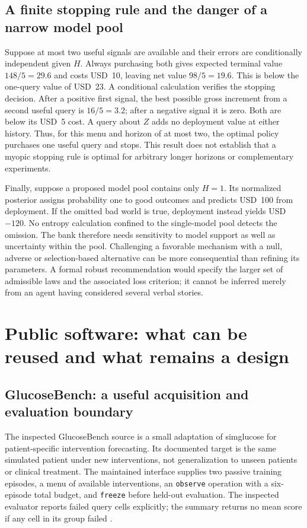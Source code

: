 \subsection{A finite stopping rule and the danger of a narrow model pool}

Suppose at most two useful signals are available and their errors are
conditionally independent given $H$. Always purchasing both gives expected
terminal value $148/5=29.6$ and costs USD~10, leaving net value $98/5=19.6$.
This is below the one-query value of USD~23. A conditional calculation verifies
the stopping decision. After a positive first signal, the best possible gross
increment from a second useful query is $16/5=3.2$; after a negative signal
it is zero. Both are below its USD~5 cost. A query about $Z$ adds no deployment
value at either history. Thus, for this menu and horizon of at most two,
the optimal policy purchases one useful query and stops. This result does
not establish that a myopic stopping rule is optimal for arbitrary longer
horizons or complementary experiments.

Finally, suppose a proposed model pool contains only $H=1$. Its normalized
posterior assigns probability one to good outcomes and predicts USD~100 from
deployment. If the omitted bad world is true, deployment instead yields
USD~$-120$. No entropy calculation confined to the single-model pool detects
the omission. The bank therefore needs sensitivity to model support as well
as uncertainty within the pool. Challenging a favorable mechanism with a
null, adverse or selection-based alternative can be more consequential than
refining its parameters. A formal robust recommendation would specify the
larger set of admissible laws and the associated loss criterion; it cannot
be inferred merely from an agent having considered several verbal stories.

\section{Public software: what can be reused and what remains a design}

\subsection{GlucoseBench: a useful acquisition and evaluation boundary}

The inspected GlucoseBench source is a small adaptation of simglucose for
patient-specific intervention forecasting. Its documented target is the same
simulated patient under new interventions, not generalization to unseen
patients or clinical treatment. The maintained interface supplies two passive
training episodes, a menu of available interventions, an \texttt{observe}
operation with a six-episode total budget, and \texttt{freeze} before held-out
evaluation. The inspected evaluator reports failed query cells explicitly;
the summary returns no mean score if any cell in its group failed
\cite{exec13_active_glucosebench}.

